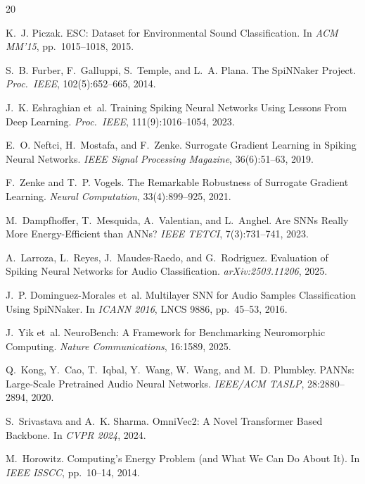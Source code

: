 \documentclass[sigconf,nonacm=false]{acmart}
\begin{document}

\begin{thebibliography}{20}

K.~J. Piczak.
\newblock ESC: Dataset for Environmental Sound Classification.
\newblock In \textit{ACM MM'15}, pp.~1015--1018, 2015.

S.~B. Furber, F.~Galluppi, S.~Temple, and L.~A. Plana.
\newblock The SpiNNaker Project.
\newblock \textit{Proc.\ IEEE}, 102(5):652--665, 2014.

J.~K. Eshraghian et~al.
\newblock Training Spiking Neural Networks Using Lessons From Deep Learning.
\newblock \textit{Proc.\ IEEE}, 111(9):1016--1054, 2023.

E.~O. Neftci, H.~Mostafa, and F.~Zenke.
\newblock Surrogate Gradient Learning in Spiking Neural Networks.
\newblock \textit{IEEE Signal Processing Magazine}, 36(6):51--63, 2019.

F.~Zenke and T.~P. Vogels.
\newblock The Remarkable Robustness of Surrogate Gradient Learning.
\newblock \textit{Neural Computation}, 33(4):899--925, 2021.

M.~Dampfhoffer, T.~Mesquida, A.~Valentian, and L.~Anghel.
\newblock Are SNNs Really More Energy-Efficient than ANNs?
\newblock \textit{IEEE TETCI}, 7(3):731--741, 2023.

A.~Larroza, L.~Reyes, J.~Maudes-Raedo, and G.~Rodriguez.
\newblock Evaluation of Spiking Neural Networks for Audio Classification.
\newblock \textit{arXiv:2503.11206}, 2025.

J.~P. Dominguez-Morales et~al.
\newblock Multilayer SNN for Audio Samples Classification Using SpiNNaker.
\newblock In \textit{ICANN 2016}, LNCS 9886, pp.~45--53, 2016.

J.~Yik et~al.
\newblock NeuroBench: A Framework for Benchmarking Neuromorphic Computing.
\newblock \textit{Nature Communications}, 16:1589, 2025.

Q.~Kong, Y.~Cao, T.~Iqbal, Y.~Wang, W.~Wang, and M.~D. Plumbley.
\newblock PANNs: Large-Scale Pretrained Audio Neural Networks.
\newblock \textit{IEEE/ACM TASLP}, 28:2880--2894, 2020.

S.~Srivastava and A.~K. Sharma.
\newblock OmniVec2: A Novel Transformer Based Backbone.
\newblock In \textit{CVPR 2024}, 2024.

M.~Horowitz.
\newblock Computing's Energy Problem (and What We Can Do About It).
\newblock In \textit{IEEE ISSCC}, pp.~10--14, 2014.


\end{thebibliography}
\end{document}
